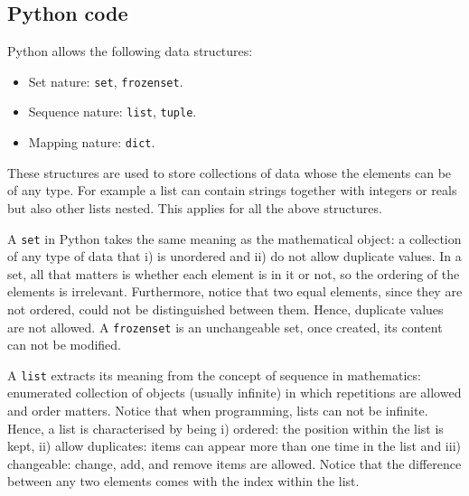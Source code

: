         \newpage 
        \subsection*{Python code}
Python allows the following data structures: 
\begin{itemize}[noitemsep]    
    \item Set nature: \texttt{set}, \texttt{frozenset}.
    \item Sequence nature: \texttt{list}, \texttt{tuple}.
    \item Mapping nature: \texttt{dict}.
\end{itemize}

These structures are used to store collections of data whose the elements can be of any type. 
For example a list can contain strings together with integers or reals but also other lists nested. 
This applies for all the above structures.

A \texttt{set} in Python takes the same meaning as the mathematical object: a collection of any type of data that 
i) is unordered and 
ii) do not allow duplicate values. 
In a set, all that matters is whether each element is in it or not, so the ordering of the elements is irrelevant.
Furthermore, notice that two equal elements, since they are not ordered, could not be distinguished between them. 
Hence, duplicate values are not allowed.
A \texttt{frozenset} is an unchangeable set, once created, its content can not be modified. 



A \texttt{list} extracts its meaning from the concept of sequence in mathematics: 
enumerated collection of objects (usually infinite) in which repetitions are allowed and order matters.
Notice that when programming, lists can not be infinite.
Hence, a list is characterised by being 
i) ordered: the position within the list is kept, 
ii) allow duplicates: items can appear more than one time in the list and  
iii) changeable: change, add, and remove items are allowed.
Notice that the difference between any two elements comes with the index within the list.


